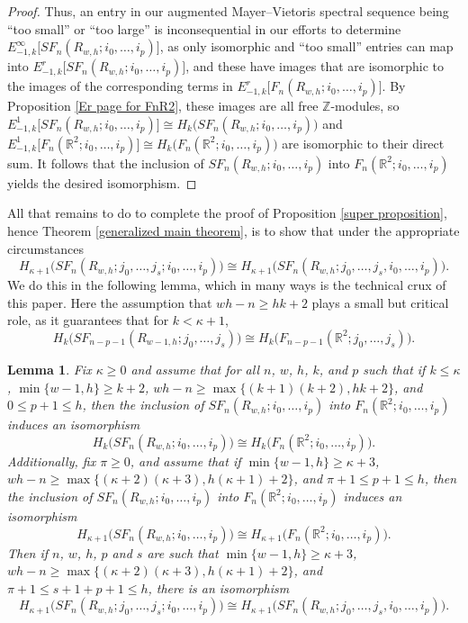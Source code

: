 \documentclass[pagebackref,colorlinks,citecolor=blue,linkcolor=blue,urlcolor=blue,filecolor=blue]{article}
\newtheorem{lem}[thm]{Lemma}
\theoremstyle{definition}\newtheorem{definition}[thm]{Definition}
\theoremstyle{definition}
\newcommand{\Z}{\ensuremath{\mathbb{Z}}}
\newcommand{\R}{\ensuremath{\mathbb{R}}}
\begin{document}
\begin{proof}
Thus, an entry in our augmented Mayer--Vietoris spectral sequence being ``too small'' or ``too large'' is inconsequential in our efforts to determine $E_{-1,k}^{\infty}\big[SF_{n}(R_{w,h}; i_{0}, \dots, i_{p})\big]$, as only isomorphic and ``too small'' entries can map into $E^{r}_{-1,k}\big[SF_{n}(R_{w,h}; i_{0}, \dots, i_{p})\big]$, and these have images that are isomorphic to the images of the corresponding terms in $E^{r}_{-1,k}\big[F_{n}(R_{w,h}; i_{0}, \dots, i_{p})\big]$.
By Proposition \ref{Er page for FnR2}, these images are all free $\Z$-modules, so $E^{1}_{-1,k}\big[SF_{n}(R_{w,h}; i_{0}, \dots, i_{p})]\cong H_{k}\big(SF_{n}(R_{w,h}; i_{0}, \dots, i_{p})\big)$ and $E^{1}_{-1,k}\big[F_{n}(\R^{2}; i_{0}, \dots, i_{p})]\cong H_{k}\big(F_{n}(\R^{2}; i_{0}, \dots, i_{p})\big)$ are isomorphic to their direct sum.
It follows that the inclusion of $SF_{n}(R_{w,h}; i_{0}, \dots, i_{p})$ into $F_{n}(\R^{2}; i_{0}, \dots, i_{p})$ yields the desired isomorphism. 
\end{proof}

All that remains to do to complete the proof of Proposition \ref{super proposition}, hence Theorem \ref{generalized main theorem}, is to show that under the appropriate circumstances
\[
H_{\kappa+1}\big(SF_{n}(R_{w, h};j_{0}, \dots, j_{s};i_{0},\dots, i_{p})\big)\cong H_{\kappa+1}\big(SF_{n}(R_{w, h};j_{0}, \dots, j_{s},i_{0},\dots, i_{p})\big).
\]
We do this in the following lemma, which in many ways is the technical crux of this paper. Here the assumption that $wh-n\ge hk+2$ plays a small but critical role, as it guarantees that for $k<\kappa+1$,
\[
H_{k}\big(SF_{n-p-1}(R_{w-1, h};j_{0}, \dots, j_{s})\big)\cong H_{k}\big(F_{n-p-1}(\R^{2};j_{0}, \dots, j_{s})\big).
\]


\begin{lem}\label{cover j,i}
Fix $\kappa\ge0$ and assume that for all $n$, $w$, $h$, $k$, and $p$ such that if $k\le \kappa$, $\min\{w-1, h\}\ge k+2$, $wh-n\ge \max\big\{(k+1)(k+2), hk+2\big\}$, and $0\le p+1\le h$, then the inclusion of $SF_{n}(R_{w, h};i_{0},\dots, i_{p})$ into $F_{n}(\R^{2};i_{0},\dots, i_{p})$ induces an isomorphism
\[
H_{k}\big(SF_{n}(R_{w, h};i_{0},\dots, i_{p})\big)\cong H_{k}\big(F_{n}(\R^{2};i_{0},\dots, i_{p})\big).
\]
Additionally, fix $\pi\ge0$, and assume that if $\min\{w-1,h\}\ge \kappa+3$, $wh-n\ge\max\big\{(\kappa+2)(\kappa+3), h(\kappa+1)+2\big\}$, and $\pi+1\le p+1\le h$, then the inclusion of 
$SF_{n}(R_{w, h};i_{0},\dots, i_{p})$ into $F_{n}(\R^{2};i_{0},\dots, i_{p})$ 
induces an isomorphism
\[
H_{\kappa+1}\big(SF_{n}(R_{w, h};i_{0},\dots, i_{p})\big)\cong H_{\kappa+1}\big(F_{n}(\R^{2};i_{0},\dots, i_{p})\big).
\]
Then if $n$, $w$, $h$, $p$ and $s$ are such that $\min\{w-1, h\}\ge \kappa+3$, $wh-n\ge\max\big\{(\kappa+2)(\kappa+3), h(\kappa+1)+2\big\}$, and $\pi+1\le s+1+p+1\le h$, there is an isomorphism
\[
H_{\kappa+1}\big(SF_{n}(R_{w, h};j_{0}, \dots, j_{s};i_{0},\dots, i_{p})\big)\cong H_{\kappa+1}\big(SF_{n}(R_{w, h};j_{0}, \dots, j_{s},i_{0},\dots, i_{p})\big).
\]
\end{lem}
\end{document}
